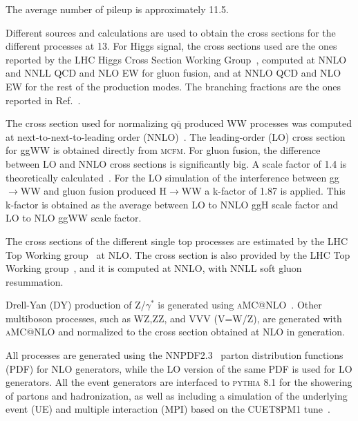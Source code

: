 The average number of pileup is approximately 11.5.


Different sources and calculations are used to obtain the cross sections for the different processes at 13\TeV. 
For Higgs signal, the cross sections used are the ones reported by the LHC Higgs Cross Section Working Group~\cite{temphiggsxsecs},
computed at NNLO and NNLL QCD and NLO EW for gluon fusion, and at NNLO QCD and NLO EW for the rest of the production modes.
The branching fractions are the ones reported in Ref.~\cite{Heinemeyer:2013tqa}. 

The cross section used for normalizing $\mathrm{q\bar q}$ produced WW processes was computed at next-to-next-to-leading order
(NNLO)~\cite{Gehrmann:2014fva}. The leading-order (LO) cross section for ggWW is obtained directly from \textsc{mcfm}.
For gluon fusion, the difference between LO and NNLO cross sections is significantly big.
A scale factor of 1.4 is theoretically calculated~\cite{Caola:2015rqy}. For the LO simulation of the interference between 
gg$\rightarrow$WW and gluon fusion  produced H$\rightarrow$WW a k-factor of 1.87 is applied. 
This k-factor is obtained as the average between LO to NNLO ggH scale factor and LO to NLO ggWW scale factor. 

The cross sections of the different single top processes are estimated by the LHC Top Working group~\cite{singletop} at NLO.
The \ttbar cross section is also provided by the LHC Top Working group~\cite{topxsec}, and it is computed at NNLO, with NNLL soft gluon resummation. 

Drell-Yan (DY) production of Z/$\gamma^{*}$ is generated using \textsc{aMC@NLO}~\cite{Alwall:2014hca}. 
Other multiboson processes, such as WZ,ZZ, and VVV (V=W/Z), are generated with \textsc{aMC@NLO} and normalized
to the cross section obtained at NLO in generation.

All processes are generated using the NNPDF2.3~\cite{Ball:2013hta,Ball:2011uy} parton distribution functions (PDF) for NLO generators,
while the LO version of the same PDF is used for LO generators. All the event generators are interfaced 
to \textsc{pythia} 8.1 for the showering of partons and hadronization, as well as including a simulation of the 
underlying event (UE) and multiple interaction (MPI) based on the CUET8PM1 tune~\cite{Khachatryan:2015pea}. 
